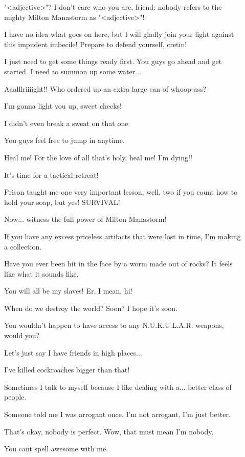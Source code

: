 \documentclass[letterpaper,10pt,twoside,twocolumn,openany]{book}
\begin{document}
\begin{description}
	\item[] "<adjective>"? I don't care who you are, friend: nobody refers to the mighty Milton Manastorm as "<adjective>"!
	\item[] I have no idea what goes on here, but I will gladly join your fight against this impudent imbecile! Prepare to defend yourself, cretin!
	\item[] I just need to get some things ready first. You guys go ahead and get started. I need to summon up some water...
	\item[] Aaalllriiiight!! Who ordered up an extra large can of whoop-ass?
	\item[] I'm gonna light you up, sweet cheeks!
	\item[] I didn't even break a sweat on that one
	\item[] You guys feel free to jump in anytime.
	\item[] Heal me! For the love of all that's holy, heal me! I'm dying!!
	\item[] It's time for a tactical retreat!
	\item[] Prison taught me one very important lesson, well, two if you count how to hold your soap, but yes! SURVIVAL!
	\item[] Now... witness the full power of Milton Manastorm!
	\item[] If you have any excess priceless artifacts that were lost in time, I'm making a collection.
	\item[] Have you ever been hit in the face by a worm made out of rocks? It feels like what it sounds like.
	\item[] You will all be my slaves! Er, I mean, hi!
	\item[] When do we destroy the world? Soon? I hope it's soon.
	\item[] You wouldn't happen to have access to any N.U.K.U.L.A.R. weapons, would you?
	\item[] Let's just say I have friends in high places...
	\item[] I've killed cockroaches bigger than that!
	\item[] Sometimes I talk to myself because I like dealing with a... better class of people.
	\item[] Someone told me I was arrogant once. I'm not arrogant, I'm just better.
	\item[] That's okay, nobody is perfect. Wow, that must mean I'm nobody.
	\item[] You cant spell awesome with me.
	
\end{description}
\end{document}
